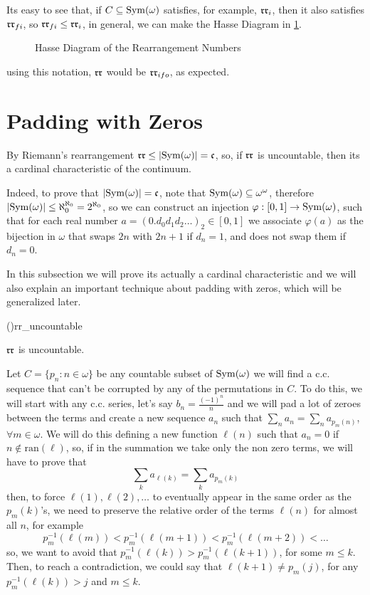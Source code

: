 Its easy to see that, if $C\subseteq\mathrm{Sym}(\omega)$ satisfies, for example, $\mathfrak{rr}_i$, then it also satisfies $\mathfrak{rr}_{fi}$, so $\mathfrak{rr}_{fi}\leq\mathfrak{rr}_i$, in general, we can make the Hasse Diagram in \cref{fig:hasse_rearrangement}.

\begin{figure}[ht]
\centering

\caption{Hasse Diagram of the Rearrangement Numbers}
\label{fig:hasse_rearrangement}
\end{figure}

using this notation, $\mathfrak{rr}$ would be $\mathfrak{rr}_{ifo}$, as expected.

\section{Padding with Zeros}

By Riemann's rearrangement $\mathfrak{rr}\leq\lvert\mathrm{Sym}(\omega)\rvert=\mathfrak{c}$, so, if $\mathfrak{rr}$ is uncountable, then its a cardinal characteristic of the continuum.

Indeed, to prove that $\lvert\mathrm{Sym}(\omega)\rvert=\mathfrak{c}$, note that $\mathrm{Sym}(\omega)\subseteq\omega^\omega$, therefore $\lvert\mathrm{Sym}(\omega)\rvert\leq\aleph_0^{\aleph_0}=2^{\aleph_0}$, so we can construct an injection $\varphi:[0,1]\to\mathrm{Sym}(\omega)$, such that for each real number $a=(0.d_0d_1d_2\dots)_2\in[0,1]$ we associate $\varphi(a)$ as the bijection in $\omega$ that swaps $2n$ with $2n+1$ if $d_n=1$, and does not swap them if $d_n=0$.

In this subsection we will prove its actually a cardinal characteristic and we will also explain an important technique about padding with zeros, which will be generalized later.

\begin{theorem}{(\cite{blass})}{rr_uncountable}
    \begin{center}
        $\mathfrak{rr}$ is uncountable.
    \end{center}
\end{theorem}

\begin{sketch}
    Let $C=\{p_n:n\in\omega\}$ be any countable subset of $\mathrm{Sym}(\omega)$ we will find a c.c. sequence that can't be corrupted by any of the permutations in $C$. To do this, we will start with any c.c. series, let's say $b_n=\frac{(-1)^n}{n}$ and we will pad a lot of zeroes between the terms and create a new sequence $a_n$ such that $\sum_n a_n=\sum_n a_{p_m(n)}$, $\forall m\in\omega$. We will do this defining a new function $\ell(n)$ such that $a_n=0$ if $n\notin\text{ran}(\ell)$, so, if in the summation we take only the non zero terms, we will have to prove that
    $$\sum_k a_{\ell(k)}=\sum_k a_{p_m(k)}$$
    then, to force $\ell(1),\ell(2),\dots$ to eventually appear in the same order as the $p_m(k)$'s, we need to preserve the relative order of the terms $\ell(n)$ for almost all $n$, for example
    $$p_m^{-1}(\ell(m))<p_m^{-1}(\ell(m+1))<p_m^{-1}(\ell(m+2))<\dots$$
    so, we want to avoid that $p_m^{-1}(\ell(k))>p_m^{-1}(\ell(k+1))$, for some $m\leq k$. Then, to reach a contradiction, we could say that $\ell(k+1)\neq p_m(j)$, for any $p_m^{-1}(\ell(k))>j$ and $m\leq k$.
\end{sketch}

